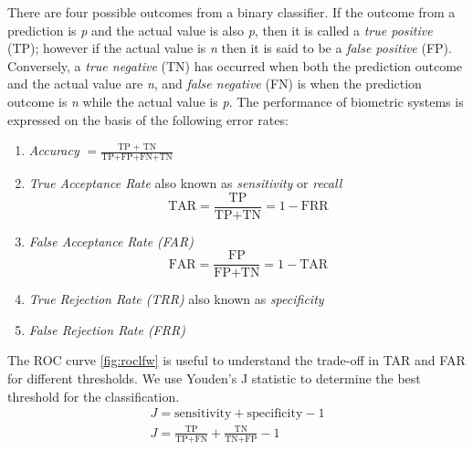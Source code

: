 \documentclass[
12pt,
tightenlines,
aps,
prb,
twocolumn,
superscriptaddress,
longbibliography,
floatfix
]{revtex4-2}
\newif\ifptitle
\newif\ifpnumber
\newcounter{para}
\newcommand\ptitle[1]{\par\refstepcounter{para}
{\ifpnumber{\noindent\textcolor{lightgray}{\textbf{\thepara}}\indent}\fi}
{\ifptitle{\textbf{[{#1}]}}\fi}}
\begin{document}
\ptitle{Biometrics} There are four possible outcomes from a binary classifier. If the outcome from a prediction is \textit{p} and the actual value is also \textit{p}, then it is called a \textit{true positive} (TP); however if the actual value is \textit{n} then it is said to be a \textit{false positive} (FP). Conversely, a \textit{true negative} (TN) has occurred when both the prediction outcome and the actual value are \textit{n}, and \textit{false negative} (FN) is when the prediction outcome is \textit{n} while the actual value is \textit{p}. The performance of biometric systems is expressed on the basis of the following error rates:
\begin{raggedright}
\begin{enumerate}
\item \textit{Accuracy} $\displaystyle{ = \frac{\text{TP + TN}}{\text{TP+FP+FN+TN}}}$
\item \textit{True Acceptance Rate} also known as \textit{sensitivity} or \textit{recall}
\begin{equation}
\nonumber \displaystyle{\text{TAR} = \frac{\text{TP}}{\text{TP+TN}} = 1-\text{FRR}}
\end{equation}
\item \textit{False Acceptance Rate (FAR)}
\begin{equation}
\nonumber \displaystyle{\text{FAR} = \frac{\text{FP}}{\text{FP+TN}} = 1-\text{TAR}}
\end{equation}
\item \textit{True Rejection Rate (TRR)} also known as \textit{specificity}
\item \textit{False Rejection Rate (FRR)}
\end{enumerate}
\end{raggedright}
The ROC curve \ref{fig:roclfw} is useful to understand the trade-off in TAR and FAR for different thresholds. We use Youden’s J statistic to determine the best threshold for the classification. 
\begin{eqnarray}
\nonumber {\displaystyle J={\text{sensitivity}}+{\text{specificity}}-1} \\
\nonumber {\displaystyle J={\frac {\text{TP}}{{\text{TP}}+{\text{FN}}}}+{\frac {\text{TN}}{{\text{TN}}+{\text{FP}}}}-1}
\end{eqnarray}

\end{document}
